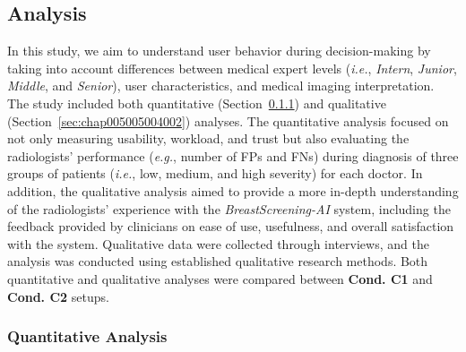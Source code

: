 

\subsection{Analysis}
\label{sec:chap005005004}

In this study, we aim to understand user behavior during decision-making by taking into account differences between medical expert levels ({\it i.e.}, {\it Intern}, {\it Junior}, {\it Middle}, and {\it Senior}), user characteristics, and medical imaging interpretation.
The study included both quantitative (Section~\ref{sec:chap005005004001}) and qualitative (Section~\ref{sec:chap005005004002}) analyses.
The quantitative analysis focused on not only measuring usability, workload, and trust but also evaluating the radiologists' performance ({\it e.g.}, number of \acp{FP} and \acp{FN}) during diagnosis of three groups of patients ({\it i.e.}, low, medium, and high severity) for each doctor.
In addition, the qualitative analysis aimed to provide a more in-depth understanding of the radiologists' experience with the {\it BreastScreening-AI} system, including the feedback provided by clinicians on ease of use, usefulness, and overall satisfaction with the system.
Qualitative data were collected through interviews, and the analysis was conducted using established qualitative research methods.
Both quantitative and qualitative analyses were compared between {\bf Cond. C1} and {\bf Cond. C2} setups.

\subsubsection{Quantitative Analysis}
\label{sec:chap005005004001}

